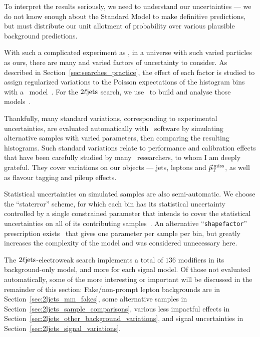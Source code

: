 To interpret the results seriously, we need to understand our uncertainties ---
we do not know enough about the Standard Model to make definitive predictions,
but must distribute our unit allotment of probability over various plausible
background predictions.

With such a complicated experiment as \atlas, in a universe with such varied
particles as ours, there are many and varied factors of uncertainty to consider.
As described in Section~\ref{sec:searches_practice}, the effect of each
factor is studied to assign regularized variations to the Poisson expectations
of the histogram bins with a \histfactory\ model~\cite{cranmer2012histfactory}.
For the $2\ell\mathrm{jets}$ search, we use \histfitter\ to build and analyse those
models~\cite{Besjes_2015,baak2015histfitter}.

Thankfully, many standard variations, corresponding to experimental
uncertainties, are evaluated automatically with \atlas\ software by simulating
alternative samples with varied parameters, then comparing the resulting
histograms.
Such standard variations relate to performance and calibration effects that
have been carefully studied by many \atlas\ researchers, to whom I am deeply
grateful.
They cover variations on our objects --- jets, leptons and $\vec p_\mathrm{T}^\mathrm{\:miss}$, as well
as flavour tagging and pileup effects.

Statistical uncertainties on simulated samples are also semi-automatic.
We choose the ``staterror'' scheme, for which each bin has its statistical
uncertainty controlled by a single constrained parameter that intends to cover
the statistical uncertainties on all of its contributing
samples~\cite{cranmer2012histfactory}.
An alternative ``\texttt{shapefactor}'' prescription
exists~\cite{cranmer2012histfactory} that gives one parameter
per sample per bin, but greatly increases the complexity of the model and
was considered unnecessary here.

The $2\ell\mathrm{jets}$-electroweak search implements a total of $136$ modifiers in its
background-only model, and more for each signal model.
Of those not evaluated automatically, some of the more interesting or important
will be discussed in the remainder of this section:
Fake/non-prompt lepton backgrounds are in Section~\ref{sec:2ljets_mm_fakes},
some alternative samples in Section~\ref{sec:2ljets_sample_comparisons},
various less impactful effects in
Section~\ref{sec:2ljets_other_background_variations},
and signal uncertainties in
Section~\ref{sec:2ljets_signal_variations}.

